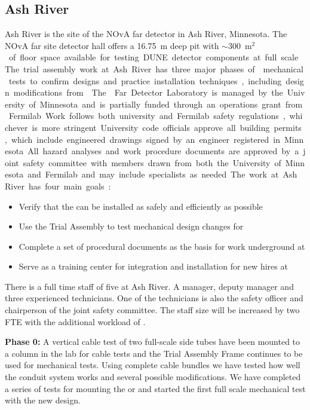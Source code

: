 \subsection{Ash River}

Ash River is the site of the NOvA far detector in Ash River,
Minnesota. The NOvA far site detector hall offers a \SI{16.75}{m} deep
pit with $\sim$\SI{300}{m$^2$} of floor space available for testing
DUNE detector components at full scale.  The trial assembly work at
Ash River has three major phases of  mechanical tests to
confirm designs and practice installation techniques, including design
modifications from .  The  Far Detector
Laboratory is managed by the University of Minnesota and is partially
funded through an operations grant from Fermilab.  Work follows both
university and Fermilab safety regulations, whichever is more
stringent. University code officials approve all building
permits, which include engineered drawings signed by an engineer
registered in Minnesota. All hazard analyses and work procedure
documents are approved by a joint safety committee with members drawn
from both the University of Minnesota and Fermilab and may include
specialists as needed.

The work at Ash River has four main goals:
\begin{itemize}
  \item Verify that the   can be installed as
    safely and efficiently as possible
  \item Use the  Trial Assembly  to test
    mechanical design changes for 
  \item Complete a set of procedural documents as the basis for work
    underground at 
  \item Serve as a training center for  integration and
      installation for new hires at 
\end{itemize}

There is a full time staff of five  at Ash River. A
manager, deputy manager and three experienced technicians.  One of the
technicians is also the safety officer and chairperson of the joint
safety committee. The staff size will be increased by two FTE with the
additional workload of .

{\bf Phase 0:} A vertical cable test of two full-scale 
side tubes have been mounted to a column in the lab for cable tests
and the  Trial Assembly Frame continues to be used
for  mechanical tests. Using complete cable
bundles we have tested how well the conduit system works and several
possible modifications. We have completed a series of tests for
mounting the  or  and started the first
full scale mechanical  test with the new design.


